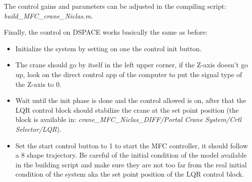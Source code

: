 {\sloppy The control gains and parameters can be adjusted in the compiling script: \\
\textit{build\_MFC\_crane\_Niclas.m}.}

Finally, the control on DSPACE works basically the same as before:
\begin{itemize}
    \item Initialize the system by setting on one the control init button.
    \item The crane should go by itself in the left upper corner, if the Z-axis doesn't go up, look on the direct control app of the computer to put the signal type of the Z-axis to 0.
    \item Wait until the init phase is done and the control allowed is on, after that the LQR control block should stabilize the crane at the set point position (the block is available in: \textit{crane\_MFC\_Niclas\_DIFF/Portal Crane System/Crtl Selector/LQR}).
    \item Set the start control button to 1 to start the MFC controller, it should follow a 8 shape trajectory. Be careful of the initial condition of the model available in the building script and make sure they are not too far from the real initial condition of the system aka the set point position of the LQR control block.
\end{itemize}
